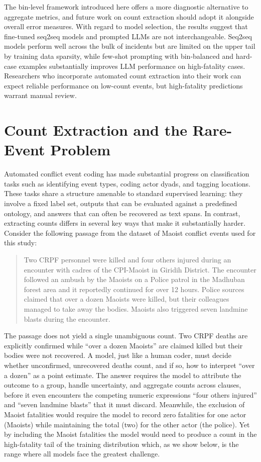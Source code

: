 \documentclass[
  11pt,
]{article}
\begin{document}
The bin-level framework introduced here offers a more diagnostic
alternative to aggregate metrics, and future work on count extraction
should adopt it alongside overall error measures. With regard to model
selection, the results suggest that fine-tuned seq2seq models and
prompted LLMs are not interchangeable. Seq2seq models perform well
across the bulk of incidents but are limited on the upper tail by
training data sparsity, while few-shot prompting with bin-balanced and
hard-case examples substantially improves LLM performance on
high-fatality cases. Researchers who incorporate automated count
extraction into their work can expect reliable performance on low-count
events, but high-fatality predictions warrant manual review.

\section{Count Extraction and the Rare-Event
Problem}\label{count-extraction-and-the-rare-event-problem}

Automated conflict event coding has made substantial progress on
classification tasks such as identifying event types, coding actor
dyads, and tagging locations. These tasks share a structure amenable to
standard supervised learning: they involve a fixed label set, outputs
that can be evaluated against a predefined ontology, and answers that
can often be recovered as text spans. In contrast, extracting counts
differs in several key ways that make it substantially harder. Consider
the following passage from the dataset of Maoist conflict events used
for this study:

\begin{quote}
Two CRPF personnel were killed and four others injured during an
encounter with cadres of the CPI-Maoist in Giridih District. The
encounter followed an ambush by the Maoists on a Police patrol in the
Madhuban forest area and it reportedly continued for over 12 hours.
Police sources claimed that over a dozen Maoists were killed, but their
colleagues managed to take away the bodies. Maoists also triggered seven
landmine blasts during the encounter.
\end{quote}

\noindent The passage does not yield a single unambiguous count. Two
CRPF deaths are explicitly confirmed while ``over a dozen Maoists'' are
claimed killed but their bodies were not recovered. A model, just like a
human coder, must decide whether unconfirmed, unrecovered deaths count,
and if so, how to interpret ``over a dozen'' as a point estimate. The
answer requires the model to attribute the outcome to a group, handle
uncertainty, and aggregate counts across clauses, before it even
encounters the competing numeric expressions ``four others injured'' and
``seven landmine blasts'' that it must discard. Meanwhile, the exclusion
of Maoist fatalities would require the model to record zero fatalities
for one actor (Maoists) while maintaining the total (two) for the other
actor (the police). Yet by including the Maoist fatalities the model
would need to produce a count in the high-fatality tail of the training
distribution which, as we show below, is the range where all models face
the greatest challenge.
\end{document}
